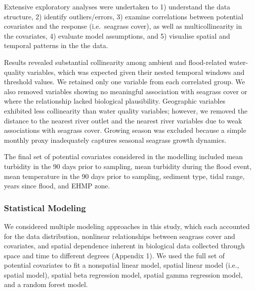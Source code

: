 \documentclass[
  letterpaper,
  DIV=11,
  numbers=noendperiod]{scrartcl}
\begin{document}
Extensive exploratory analyses were undertaken to 1) understand the data
structure, 2) identify outliers/errors, 3) examine correlations between
potential covariates and the response (i.e.~seagrass cover), as well as
multicollinearity in the covariates, 4) evaluate model assumptions, and
5) visualise spatial and temporal patterns in the the data.

Results revealed substantial collinearity among ambient and
flood-related water-quality variables, which was expected given their
nested temporal windows and threshold values. We retained only one
variable from each correlated group. We also removed variables showing
no meaningful association with seagrass cover or where the relationship
lacked biological plausibility. Geographic variables exhibited less
collinearity than water quality variables; however, we removed the
distance to the nearest river outlet and the nearest river variables due
to weak associations with seagrass cover. Growing season was excluded
because a simple monthly proxy inadequately captures seasonal seagrass
growth dynamics.

The final set of potential covariates considered in the modelling
included mean turbidity in the 90 days prior to sampling, mean turbidity
during the flood event, mean temperature in the 90 days prior to
sampling, sediment type, tidal range, years since flood, and EHMP zone.

\subsubsection{Statistical Modeling}\label{sec-mb_model}

We considered multiple modeling approaches in this study, which each
accounted for the data distribution, nonlinear relationships between
seagrass cover and covariates, and spatial dependence inherent in
biological data collected through space and time to different degrees
(Appendix 1). We used the full set of potential covariates to fit a
nonspatial linear model, spatial linear model (i.e., spatial model),
spatial beta regression model, spatial gamma regression model, and a
random forest model.
\end{document}
